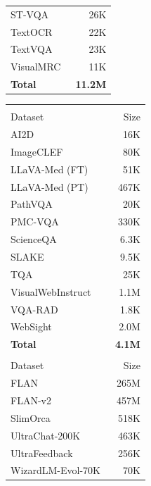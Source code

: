 \begin{table}[!h]
\begin{minipage}[t]{0.245\textwidth}
\begin{tabular}{lr}
ST-VQA~\cite{biten2019stvqa} & 26K \\
TextOCR~\cite{singh2021textocr} & 22K \\
TextVQA~\cite{singh2019towards} & 23K \\
VisualMRC~\cite{tanaka2021visualmrc} & 11K \\
\midrule
\textbf{Total} & \textbf{11.2M} \\
\bottomrule
\end{tabular}
\end{minipage}
\hfill
\begin{minipage}[t]{0.245\textwidth}
\centering
\begin{tabular}{lr}
\toprule
\rowcolor{instructcolor}\multicolumn{2}{l}{\textit{Science}} \\
Dataset & Size \\
\midrule
AI2D~\cite{kembhavi2016ai2d} & 16K \\
ImageCLEF~\cite{ionescu2024imageclef} & 80K \\
LLaVA-Med (FT)~\cite{li2023llavamed} & 51K \\
LLaVA-Med (PT)~\cite{li2023llavamed} & 467K \\
PathVQA~\cite{he2020pathvqa} & 20K \\
PMC-VQA~\cite{zhang2023pmcvqa} & 330K \\
ScienceQA~\cite{lu2022learn} & 6.3K \\
SLAKE~\cite{liu2021slake} & 9.5K \\
TQA~\cite{kembhavi2017tqa} & 25K \\
VisualWebInstruct~\cite{jia2025visualwebinstruct} & 1.1M \\
VQA-RAD~\cite{lau2018vqarad} & 1.8K \\
WebSight~\cite{laurencon2024unlocking} & 2.0M \\
\midrule
\textbf{Total} & \textbf{4.1M} \\
\midrule
\rowcolor{textcolor}\multicolumn{2}{l}{\textit{Text}} \\
Dataset & Size \\
\midrule
FLAN~\cite{wei2022finetuned} & 265M \\
FLAN-v2~\cite{longpre2023flan} & 457M \\
SlimOrca~\cite{lian2023slimorca} & 518K \\
UltraChat-200K~\cite{ding2023enhancing} & 463K \\
UltraFeedback~\cite{cui2024ultrafeedback} & 256K \\
WizardLM-Evol-70K~\cite{xu2024wizardlm} & 70K \\

\end{tabular}
\end{minipage}
\end{table}
